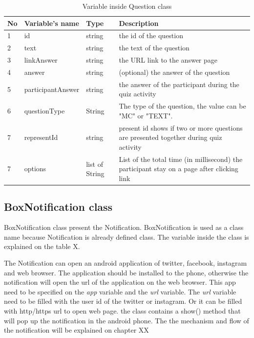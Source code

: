 \begin{table}
  \centering
  \begin{longtable}{ |p{0.5cm}|p{4cm}|p{2.3cm}|p{6cm}|  }
 \hline
 No& Variable's name & Type & Description \\
 \hline
 1 & id & string  & the id of the question\\
 2 & text & string & the text of the question\\
 3 & linkAnswer & string & the URL link to the answer page \\
 4 & answer & string & (optional) the answer of the question \\
 5 & participantAnswer & string & the answer of the participant during the quiz activity\\
 6 & questionType & String & The type of the question, the value can be "MC" or "TEXT".\\
 7 & representId & string  & present id shows if two or more questions are presented together during quiz activity\\
 7 & options & list of String  & List of the total time (in millisecond) the participant stay on a page after clicking link\\
\hline
\end{longtable}
\caption{Variable inside Question class}
 \label{tab:questionClassVariable}
\end{table} \par



\subsection{BoxNotification class}
BoxNotification class present the Notification. BoxNotification is used as a class name because Notification is already defined class.
The variable inside the class is explained on the table X.

The Notification can open an android application of twitter, facebook, instagram and web browser. The application should be installed to the phone, otherwise the notification will open the url of the application on the web browser.
This app need to be specified on the \textit{app} variable and the \textit{url} variable. The \textit{url} variable need to be filled with the user id of the twitter or instagram. Or it can be filled with http/https url to open web page. the class contains a show() method that will pop up the notification in the android phone.
The the mechanism and flow of the notification will be explained on chapter XX


